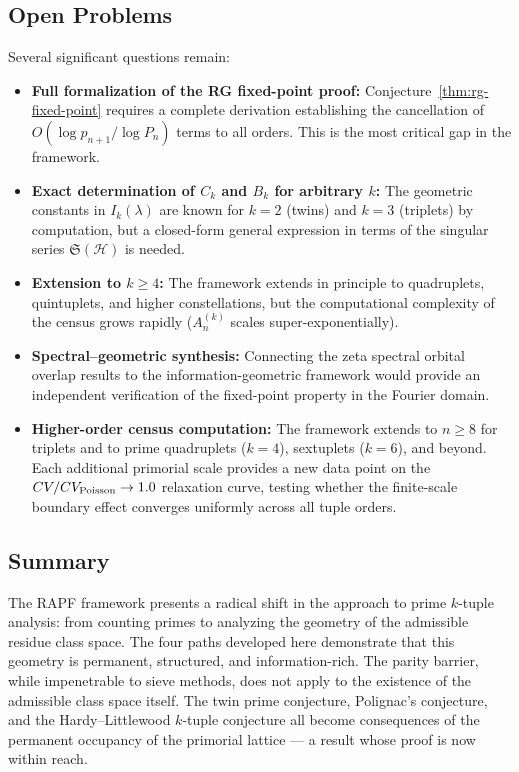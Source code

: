 \documentclass[11pt]{article}
\theoremstyle{remark}
\begin{document}
\subsection*{Open Problems}
Several significant questions remain:
\begin{itemize}
    \item \textbf{Full formalization of the RG fixed-point proof:}
    Conjecture~\ref{thm:rg-fixed-point} requires a complete derivation
    establishing the cancellation of $O(\log p_{n+1}/\log P_n)$ terms to
    all orders. This is the most critical gap in the framework.
    \item \textbf{Exact determination of $C_k$ and $B_k$ for arbitrary $k$:}
    The geometric constants in $I_k(\lambda)$ are known for $k=2$
    (twins) and $k=3$ (triplets) by computation, but a closed-form
    general expression in terms of the singular series
    $\mathfrak{S}(\mathcal{H})$ is needed.
    \item \textbf{Extension to $k \geq 4$:} The framework extends in
    principle to quadruplets, quintuplets, and higher constellations,
    but the computational complexity of the census grows rapidly
    ($A_n^{(k)}$ scales super-exponentially).
    \item \textbf{Spectral–geometric synthesis:} Connecting the zeta
    spectral orbital overlap results to the information-geometric
    framework would provide an independent verification of the fixed-point
    property in the Fourier domain.
    \item \textbf{Higher-order census computation:} The framework extends
    to $n \geq 8$ for triplets and to prime quadruplets ($k=4$), sextuplets
    ($k=6$), and beyond. Each additional primorial scale provides a new
    data point on the $CV/CV_{\rm Poisson} \to 1.0$ relaxation curve,
    testing whether the finite-scale boundary effect converges uniformly
    across all tuple orders.
\end{itemize}

\subsection*{Summary}

The RAPF framework presents a radical shift in the approach to prime
$k$-tuple analysis: from counting primes to analyzing the geometry of
the admissible residue class space. The four paths developed here
demonstrate that this geometry is permanent, structured, and
information-rich. The parity barrier, while impenetrable to sieve methods,
does not apply to the existence of the admissible class space itself.
The twin prime conjecture, Polignac's conjecture, and the Hardy--Littlewood
$k$-tuple conjecture all become consequences of the permanent occupancy
of the primorial lattice --- a result whose proof is now within reach.
\end{document}
